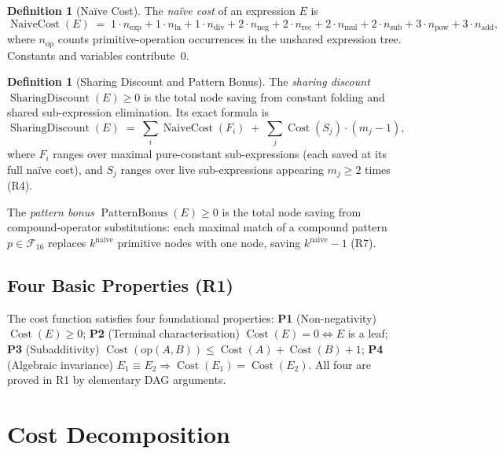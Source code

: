 \documentclass[12pt,a4paper]{article}
\theoremstyle{definition}
\newtheorem{definition}[theorem]{Definition}
\newcommand{\Cost}{\operatorname{Cost}}
\newcommand{\NC}{\operatorname{NaiveCost}}
\newcommand{\SD}{\operatorname{SharingDiscount}}
\newcommand{\PB}{\operatorname{PatternBonus}}
\begin{document}
\begin{definition}[Na\"{i}ve Cost]
\label{def:NC}
The \emph{na\"{i}ve cost} of an expression $E$ is
\[
  \NC(E) \;=\;
    1{\cdot}n_{\exp} + 1{\cdot}n_{\ln} + 1{\cdot}n_{\mathrm{div}}
  + 2{\cdot}n_{\mathrm{neg}} + 2{\cdot}n_{\mathrm{rec}}
  + 2{\cdot}n_{\mathrm{mul}} + 2{\cdot}n_{\mathrm{sub}}
  + 3{\cdot}n_{\mathrm{pow}} + 3{\cdot}n_{\mathrm{add}},
\]
where $n_{\mathrm{op}}$ counts primitive-operation occurrences in the
unshared expression tree.  Constants and variables contribute~0.
\end{definition}

\begin{definition}[Sharing Discount and Pattern Bonus]
\label{def:SDPB}
The \emph{sharing discount} $\SD(E) \geq 0$ is the total node saving from
constant folding and shared sub-expression elimination.  Its exact formula is
\[
  \SD(E) \;=\; \sum_{i} \NC(F_i) \;+\; \sum_{j} \Cost(S_j)\cdot(m_j-1),
\]
where $F_i$ ranges over maximal pure-constant sub-expressions (each saved
at its full na\"{i}ve cost), and $S_j$ ranges over live sub-expressions
appearing $m_j \geq 2$ times (R4).

The \emph{pattern bonus} $\PB(E) \geq 0$ is the total node saving from
compound-operator substitutions: each maximal match of a compound pattern
$p \in \mathcal{F}_{16}$ replaces $k^{\mathrm{naive}}$ primitive nodes with
one node, saving $k^{\mathrm{naive}}-1$ (R7).
\end{definition}

\subsection{Four Basic Properties (R1)}

The cost function satisfies four foundational properties:
\textbf{P1} (Non-negativity) $\Cost(E) \geq 0$;
\textbf{P2} (Terminal characterisation) $\Cost(E)=0 \iff E$ is a leaf;
\textbf{P3} (Subadditivity) $\Cost(\mathrm{op}(A,B)) \leq \Cost(A)+\Cost(B)+1$;
\textbf{P4} (Algebraic invariance) $E_1 \equiv E_2 \Rightarrow \Cost(E_1)=\Cost(E_2)$.
All four are proved in R1 by elementary DAG arguments.

\section{Cost Decomposition}
\label{sec:decomp}
\end{document}
